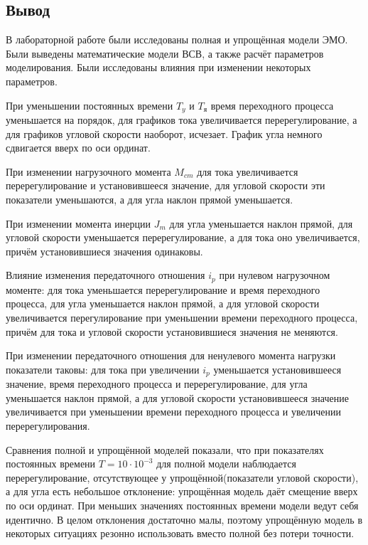 \documentclass[a4paper, 11pt]{article}
\begin{document}
\newpage
\begin{center}
	\section*{Вывод}
\end{center}
\par 
В лабораторной работе были исследованы полная и упрощённая модели ЭМО. Были выведены математические модели ВСВ, а также расчёт параметров моделирования. Были исследованы влияния при изменении некоторых параметров.
\par 
При уменьшении постоянных времени $T_y$ и $T_\text{я}$ время переходного процесса уменьшается на порядок, для графиков тока увеличивается перерегулирование, а для графиков угловой скорости наоборот, исчезает. График угла немного сдвигается вверх по оси ординат.
\par 
При изменении нагрузочного момента $M_{cm}$ для тока увеличивается перерегулирование и установившееся значение, для угловой скорости эти показатели уменьшаются, а для угла наклон прямой уменьшается.
\par 
При изменении момента инерции $J_m$ для угла уменьшается наклон прямой, для угловой скорости уменьшается перерегулирование, а для тока оно увеличивается, причём установившиеся значения одинаковы.
\par 
Влияние изменения передаточного отношения $i_p$ при нулевом нагрузочном моменте: для тока уменьшается перерегулирование и время переходного процесса, для угла уменьшается наклон прямой, а для угловой скорости увеличивается перегулирование при уменьшении времени переходного процесса, причём для тока и угловой скорости установившиеся значения не меняются.
\par 
При изменении передаточного отношения для ненулевого момента нагрузки показатели таковы: для тока при увеличении $i_p$ уменьшается установившееся значение, время переходного процесса и перерегулирование, для угла уменьшается наклон прямой, а для угловой скорости установившееся значение увеличивается при уменьшении времени переходного процесса и увеличении перерегулирования.
\par 
Сравнения полной и упрощённой моделей показали, что при показателях постоянных времени $T=10\cdot10^{-3}$ для полной модели наблюдается перерегулирование, отсутствующее у упрощённой(показатели угловой скорости), а для угла есть небольшое отклонение: упрощённая модель даёт смещение вверх по оси ординат. При меньших значениях постоянных времени модели ведут себя идентично. В целом отклонения достаточно малы, поэтому упрощённую модель в некоторых ситуациях резонно использовать вместо полной без потери точности.
\end{document}
